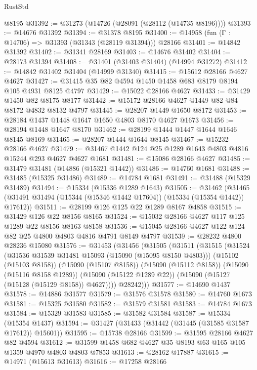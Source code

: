 \begin{lexlean}{RustStd}
\begin{coremodule}
    @8195
@31392 := @31273 (@14726 (@28091 (@28112 (@14735 @8196))))
@31393 := @14676 @31392
@31394 := @31378 @8195
@31400 := @14958 (fun (Γ : @14706) => @31393 (@31343 (@28119 @31394))) @28166
@31401 := @14842 @31392
@31402 := @31341 @28169
@31403 := @14676 @31402
@31404 := @28173 @31394
@31408 := @31401 (@31403 @31404) (@14994 @31272)
@31412 := @14842 @31402 @31404 (@14999 @31340)
@31415 := @15612 @28166 @4627 @4627
@31427 := @31415 @35 @82 @4594 @1450 @1458 @683 @8179 @8194 @105 @4931 @8125 @4797
@31429 := @15022 @28166 @4627
@31433 := @31429 @1450 @82 @8175 @8177
@31442 := @15172 @28166 @4627 @1449 @82 @84 @8172 @4832 @8132 @4797
@31445 := @28207 @1449 @1650 @8172
@31453 := @28184 @1437 @1448 @1647 @1650 @4803 @8170 @4627 @1673
@31456 := @28194 @1448 @1647 @8170
@31462 := @28199 @1444 @1447 @1644 @1646 @8145 @8169
@31465 := @28207 @1444 @1644 @8145
@31467 := @15232 @28166 @4627
@31479 := @31467 @1442 @124 @25 @1289 @1643 @4803 @4816 @15244 @293 @4627 @4627 @1681
@31481 := @15086 @28166 @4627
@31485 := @31479 @31481 (@14886 (@15321 @1442))
@31486 := @14760 @1681
@31488 := @31485 (@15325 @31486)
@31489 := @14784 @1681
@31491 := @31488 (@15329 @31489)
@31494 := @15334 (@15336 @1289 @1643)
@31505 := @31462
    (@31465 (@31491 @31494 (@15344 (@15346 @1442 @17604)) (@15334 (@15354 @1442)) @17612))
@31511 := @28199 @126 @125 @22 @1289 @8167 @4858
@31515 := @31429 @126 @22 @8156 @8165
@31524 := @15032 @28166 @4627 @117 @125 @1289 @22 @8156 @8163 @8158
@31536 := @15045 @28166 @4627 @122 @124 @82 @25 @4800 @4803 @4816 @4791 @8149 @4797
@31539 := @28232 @4800 @28236 @15080
@31576 := @31453
    (@31456
      (@31505
        (@31511
          (@31515
            (@31524
              (@31536 @31539 @31481 @15093 (@15090 (@15095 @8150 @4803)))
              (@15102 (@15103 @8158))
              (@15090 (@15107 @8158))
              (@15090 (@15112 @8158))
              (@15090 (@15116 @8158 @1289))
              (@15090 (@15122 @1289 @22))
              (@15090 (@15127 (@15128 (@15129 @8158)) @4627))))
          @28242)))
@31577 := @14690 @1437
@31578 := @14886 @31577
@31579 := @31576 @31578
@31580 := @14760 @1673
@31581 := @15325 @31580
@31582 := @31579 @31581
@31583 := @14784 @1673
@31584 := @15329 @31583
@31585 := @31582 @31584
@31587 := @15334 (@15354 @1437)
@31594 := @31427 (@31433 (@31442 (@31445 (@31585 @31587 @17612)) @15601))
@31595 := @15738 @28166
@31599 := @31595 @28166 @4627 @82 @4594
@31612 := @31599 @1458 @682 @4627 @35 @8193 @63 @165 @105 @1359 @4970 @4803 @4803 @7853
@31613 := @28162 @17887
@31615 := @14971 (@15613 @31613)
@31616 := @17258 @28166

\end{coremodule}
\end{lexlean}
